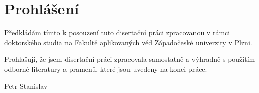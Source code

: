 \thispagestyle{empty}
\chapter*{Prohlášení}

\noindent Předkládám tímto k posouzení tuto disertační práci zpracovanou v rámci doktorského studia na Fakultě aplikovaných věd Západočeské univerzity v Plzni.

\vspace*{1cm}

\noindent Prohlašuji, že jsem disertační práci zpracovala samostatně a výhradně s použitím odborné literatury a pramenů, které jsou uvedeny na konci práce.

\vspace*{2cm}


 \hspace*{8cm} {Petr Stanislav}
